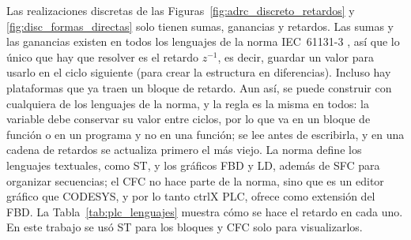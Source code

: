 Las realizaciones discretas de las Figuras~\ref{fig:adrc_discreto_retardos} y
\ref{fig:disc_formas_directas} solo tienen sumas, ganancias y retardos. Las sumas y las ganancias
existen en todos los lenguajes de la norma IEC~61131-3 \cite{iec61131}, así que lo único que hay que
resolver es el retardo $z^{-1}$, es decir, guardar un valor para usarlo en el ciclo siguiente (para crear la estructura en diferencias). Incluso
hay plataformas que ya traen un bloque de retardo. Aun así, se puede construir con cualquiera de los lenguajes de la
norma, y la
regla es la misma en todos: la variable debe conservar su valor entre ciclos, por lo que va en un
bloque de función o en un programa y no en una función; se lee antes de escribirla, y en una cadena
de retardos se actualiza primero el más viejo. La norma define los lenguajes textuales, como ST, y
los gráficos FBD y LD, además de SFC para organizar secuencias; el CFC no hace parte de la norma,
sino que es un editor gráfico que CODESYS, y por lo tanto ctrlX PLC, ofrece como extensión del FBD.
La Tabla~\ref{tab:plc_lenguajes} muestra cómo se hace el retardo en cada uno. En
este trabajo se usó ST para los bloques y CFC solo para visualizarlos.

